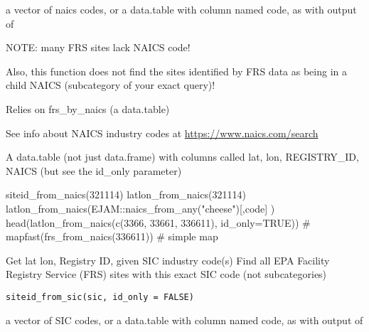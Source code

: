 \documentclass[a4paper]{book}
\begin{document}
%
\begin{Arguments}
\begin{ldescription}
\item[\code{naics}] a vector of naics codes, or
a data.table with column named code, as with output of 
\end{ldescription}
\end{Arguments}
%
\begin{Details}\relax
NOTE: many FRS sites lack NAICS code!

Also, this function does not find the sites
identified by FRS data as being in a child NAICS (subcategory of your exact query)!

Relies on  frs\_by\_naics (a data.table)

See info about NAICS industry codes at \url{https://www.naics.com/search}
\end{Details}
%
\begin{Value}
A data.table (not just data.frame) with columns called
lat, lon, REGISTRY\_ID, NAICS (but see the id\_only parameter)
\end{Value}
%
\begin{Examples}
\begin{ExampleCode}
  siteid_from_naics(321114)
  latlon_from_naics(321114)
  latlon_from_naics(EJAM::naics_from_any("cheese")[,code] )
  head(latlon_from_naics(c(3366, 33661, 336611), id_only=TRUE))
  # mapfast(frs_from_naics(336611)) # simple map
\end{ExampleCode}
\end{Examples}
%
\begin{Description}\relax
Get lat lon, Registry ID, given SIC industry code(s)
Find all EPA Facility Registry Service (FRS) sites with this exact SIC code (not subcategories)
\end{Description}
%
\begin{Usage}
\begin{verbatim}
siteid_from_sic(sic, id_only = FALSE)
\end{verbatim}
\end{Usage}
%
\begin{Arguments}
\begin{ldescription}
\item[\code{sic}] a vector of SIC codes, or
a data.table with column named code, as with output of 
\end{ldescription}
\end{Arguments}
\end{document}
